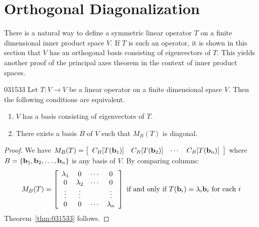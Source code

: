 \section{Orthogonal Diagonalization}
\label{sec:10_3}

There is a natural way to define a symmetric linear operator $T$ on a finite dimensional inner product space $V$. If $T$ is such an operator, it is shown in this section that $V$ has an orthogonal basis consisting of eigenvectors of $T$. This yields another proof of the principal axes theorem in the context of inner product spaces.

\begin{theorem}{}{031533}
Let $T : V \to V$ be a linear operator on a finite dimensional space $V$. Then the following conditions are equivalent.

\begin{enumerate}
\item $V$ has a basis consisting of eigenvectors of $T$.

\item There exists a basis $B$ of $V$ such that $M_B(T)$ is diagonal.
\end{enumerate}
\end{theorem}

\begin{proof}
We have $M_{B}(T) = 
\left[ \begin{array}{cccc}
C_{B}[T(\textbf{b}_{1})] & C_{B}[T(\textbf{b}_{2})] & \cdots & C_{B}[T(\textbf{b}_{n})]
\end{array} \right]$ where $B = \{\textbf{b}_{1}, \textbf{b}_{2}, \dots, \textbf{b}_{n}\}$ is any basis of $V$. By comparing columns:
\begin{equation*}
M_B(T) =
\left[ \begin{array}{cccc}
\lambda_1 & 0 & \cdots & 0 \\
0 & \lambda_2 & \cdots & 0 \\
\vdots & \vdots & & \vdots \\
0 & 0 & \cdots & \lambda_n
\end{array} \right]
\mbox{ if and only if } T(\textbf{b}_i) = \lambda_i \textbf{b}_i \mbox{ for each } i
\end{equation*}
Theorem~\ref{thm:031533} follows.
\end{proof}

